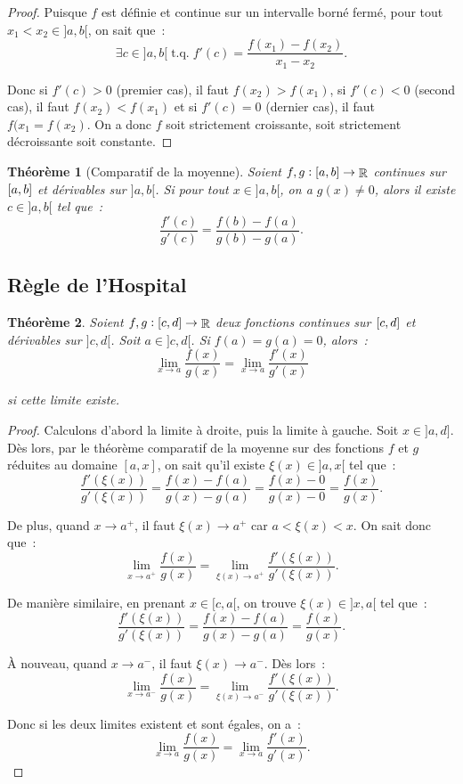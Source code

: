 \documentclass{article}
\DeclareMathOperator{\R}{\mathbb R}
\DeclareMathOperator{\tq}{ t.q. }
\newcommand{\ab}{\interval ab}
\newcommand{\fabr}[1]{#1 : \ab \to \R}
\newtheorem{thm}{Théorème}[section]
\theoremstyle{definition}
\theoremstyle{remark}
\begin{document}
		\begin{proof} Puisque $f$ est définie et continue sur un intervalle borné fermé, pour tout $x_1 < x_2 \in ]a, b[$, on sait que~:
		\[\exists c \in ]a, b[ \tq f'(c) = \frac {f(x_1)-f(x_2)}{x_1-x_2}.\]

		Donc si $f'(c) > 0$ (premier cas), il faut $f(x_2) > f(x_1)$, si $f'(c) < 0$ (second cas), il faut $f(x_2) < f(x_1)$ et si $f'(c) = 0$ (dernier cas), il faut
		$f(x_1 = f(x_2)$. On a donc $f$ soit strictement croissante, soit strictement décroissante soit constante. \end{proof}

		\begin{thm}[Comparatif de la moyenne] Soient $\fabr {f, g}$ continues sur $\ab$ et dérivables sur $]a, b[$. Si pour tout $x \in ]a, b[$, on a $g(x) \neq 0$,
		alors il existe $c \in ]a, b[$ tel que~:
		\[\frac {f'(c)}{g'(c)} = \frac {f(b)-f(a)}{g(b)-g(a)}.\]
		\end{thm}
	
	\subsection{Règle de l'Hospital}
		
		\begin{thm} Soient $f, g : \interval cd \to \R$ deux fonctions continues sur $\interval cd$ et dérivables sur $]c, d[$. Soit $a \in ]c, d[$.
		Si $f(a) = g(a) = 0$, alors~:
		\[\lim_{x \to a}\frac {f(x)}{g(x)} = \lim_{x \to a}\frac {f'(x)}{g'(x)}\]

		si cette limite existe. \end{thm}

		\begin{proof} Calculons d'abord la limite à droite, puis la limite à gauche. Soit $x \in ]a, d]$. Dès lors, par le théorème comparatif de la moyenne
		sur des fonctions $f$ et $g$ réduites au domaine $[a, x]$, on sait qu'il existe $\xi(x) \in ]a, x[$ tel que~:
		\[\frac {f'(\xi(x))}{g'(\xi(x))} = \frac {f(x)-f(a)}{g(x)-g(a)} = \frac {f(x)-0}{g(x)-0} = \frac {f(x)}{g(x)}.\]

		De plus, quand $x \to a^+$, il faut $\xi(x) \to a^+$ car $a < \xi(x) < x$. On sait donc que~:
		\[\lim_{x \to a^+}\frac {f(x)}{g(x)} = \lim_{\xi(x) \to a^+}\frac {f'(\xi(x))}{g'(\xi(x))}.\]

		De manière similaire, en prenant $x \in [c, a[$, on trouve $\xi(x) \in ]x, a[$ tel que~:
		\[\frac {f'(\xi(x))}{g'(\xi(x))} = \frac {f(x)-f(a)}{g(x)-g(a)} = \frac {f(x)}{g(x)}.\]

		À nouveau, quand $x \to a^-$, il faut $\xi(x) \to a^-$. Dès lors~:
		\[\lim_{x \to a^-}\frac {f(x)}{g(x)} = \lim_{\xi(x) \to a^-}\frac {f'(\xi(x))}{g'(\xi(x))}.\]

		Donc si les deux limites existent et sont égales, on a~:
		\[\lim_{x \to a}\frac {f(x)}{g(x)} = \lim_{x \to a}\frac {f'(x)}{g'(x)}.\]
		\end{proof}
		
\end{document}
